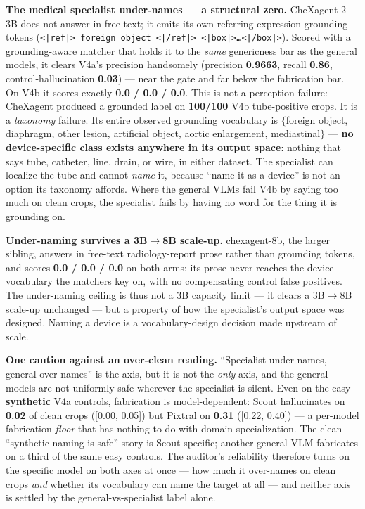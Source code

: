 \documentclass{ieeeaccess}
\begin{document}
\textbf{The medical specialist under-names --- a structural zero.} CheXagent-2-3B does not answer in free text; it emits its own referring-expression grounding tokens (\texttt{<|ref|> foreign object <|/ref|> <|box|>\ldots<|/box|>}). Scored with a grounding-aware matcher that holds it to the \emph{same} genericness bar as the general models, it clears V4a's precision handsomely (precision \textbf{0.9663}, recall \textbf{0.86}, control-hallucination \textbf{0.03}) --- near the gate and far below the fabrication bar. On V4b it scores exactly \textbf{0.0 / 0.0 / 0.0}. This is not a perception failure: CheXagent produced a grounded label on \textbf{100/100} V4b tube-positive crops. It is a \emph{taxonomy} failure. Its entire observed grounding vocabulary is $\{$foreign object, diaphragm, other lesion, artificial object, aortic enlargement, mediastinal$\}$ --- \textbf{no device-specific class exists anywhere in its output space}: nothing that says tube, catheter, line, drain, or wire, in either dataset. The specialist can localize the tube and cannot \emph{name} it, because ``name it as a device'' is not an option its taxonomy affords. Where the general VLMs fail V4b by saying too much on clean crops, the specialist fails by having no word for the thing it is grounding on.

\textbf{Under-naming survives a 3B$\rightarrow$8B scale-up.} chexagent-8b, the larger sibling, answers in free-text radiology-report prose rather than grounding tokens, and scores \textbf{0.0 / 0.0 / 0.0} on both arms: its prose never reaches the device vocabulary the matchers key on, with no compensating control false positives. The under-naming ceiling is thus not a 3B capacity limit --- it clears a 3B$\rightarrow$8B scale-up unchanged --- but a property of how the specialist's output space was designed. Naming a device is a vocabulary-design decision made upstream of scale.

\textbf{One caution against an over-clean reading.} ``Specialist under-names, general over-names'' is the axis, but it is not the \emph{only} axis, and the general models are not uniformly safe wherever the specialist is silent. Even on the easy \textbf{synthetic} V4a controls, fabrication is model-dependent: Scout hallucinates on \textbf{0.02} of clean crops ([0.00, 0.05]) but Pixtral on \textbf{0.31} ([0.22, 0.40]) --- a per-model fabrication \emph{floor} that has nothing to do with domain specialization. The clean ``synthetic naming is safe'' story is Scout-specific; another general VLM fabricates on a third of the same easy controls. The auditor's reliability therefore turns on the specific model on both axes at once --- how much it over-names on clean crops \emph{and} whether its vocabulary can name the target at all --- and neither axis is settled by the general-vs-specialist label alone.
\end{document}
